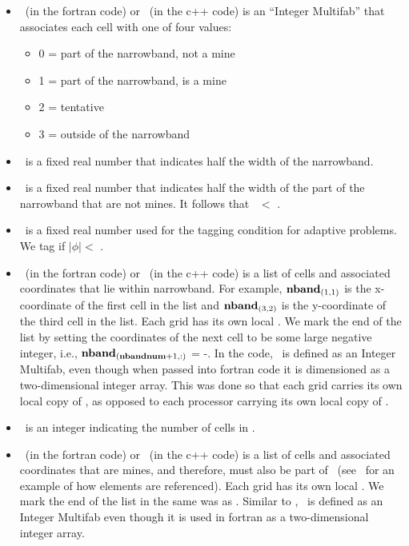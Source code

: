 \begin{itemize}

\item \type~(in the fortran code) or \LStype~(in the c++ code) is an ``Integer Multifab'' that associates each cell with one of four values:

\begin{itemize}
\item 0 = part of the narrowband, not a mine
\item 1 = part of the narrowband, is a mine
\item 2 = tentative
\item 3 = outside of the narrowband
\end{itemize}

\item \nbandwidth~is a fixed real number that indicates half the width of the narrowband.

\item \mineloc~is a fixed real number that indicates half the width of the part of the narrowband that are not mines.  It follows that \mineloc~$<$ \nbandwidth.

\item \lvlerr~is a fixed real number used for the tagging condition for adaptive problems.  We tag if $|\phi|<$ \lvlerr.

\item \nband~(in the fortran code) or \LSnband~(in the c++ code) is a list of cells and associated coordinates that lie within narrowband.  For example, ${\tt{\bf nband}}_{(1,1)}$ is the x-coordinate of the first cell in the list and ${\tt{\bf nband}}_{(3,2)}$ is the y-coordinate of the third cell in the list.  Each grid has its own local \nband.  We mark the end of the list by setting the coordinates of the next cell to be some large negative integer, i.e., ${\tt{\bf nband}}_{({\tt{\bf nbandnum}}+1,:)}$ = -\LARGEINT.  In the code, \nband~is defined as an Integer Multifab, even though when passed into fortran code it is dimensioned as a two-dimensional integer array.  This was done so that each grid carries its own local copy of \nband, as opposed to each processor carrying its own local copy of \nband.

\item \nbandnum~is an integer indicating the number of cells in \nband.

\item \mine~(in the fortran code) or \LSmine~(in the c++ code) is a list of cells and associated coordinates that are mines, and therefore, must also be part of \nband~(see \nband~for an example of how elements are referenced).  Each grid has its own local \mine.  We mark the end of the list in the same was as \nband.  Similar to \nband, \mine~is defined as an Integer Multifab even though it is used in fortran as a two-dimensional integer array.


\end{itemize}
